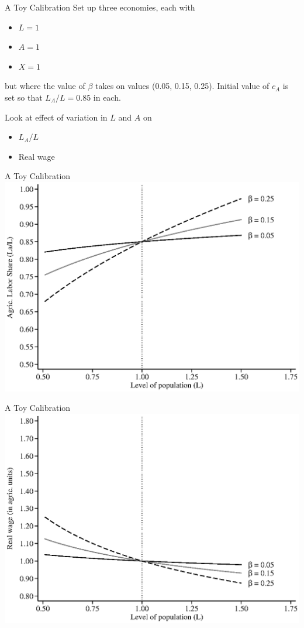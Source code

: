 \documentclass[10pt, xcolor=dvipsnames]{beamer}
\begin{document}
\begin{frame}{A Toy Calibration}
Set up three economies, each with
\begin{itemize}
  \item $L = 1$
  \item $A = 1$
  \item $X = 1$
\end{itemize}
but where the value of $\beta$ takes on values (0.05, 0.15, 0.25). Initial value of $c_A$ is set so that $L_A/L = 0.85$ in each.

\vspace{.2cm} Look at effect of variation in $L$ and $A$ on 
\begin{itemize}
  \item $L_A/L$
  \item Real wage
\end{itemize}

\end{frame}

\begin{frame}{A Toy Calibration}
\includegraphics[width=.8\textwidth]{fig_sim_L_LaL.eps}
\end{frame}

\begin{frame}{A Toy Calibration}
\includegraphics[width=.8\textwidth]{fig_sim_L_w.eps}
\end{frame}
\end{document}
